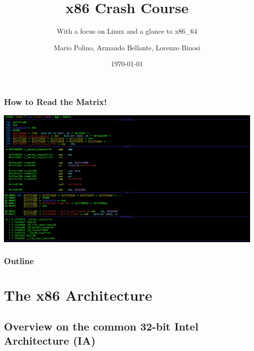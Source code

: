 \documentclass[]{beamer}
\title{x86 Crash Course}
\subtitle{With a focus on Linux and a glance to x86\_64}
\author[NECSTLab]{Mario Polino, Armando Bellante, Lorenzo Binosi}
\institute{DEIB, Politecnico di Milano}
\date{\today}
\begin{document}
\begin{frame}
	\titlepage
\end{frame}



\begin{frame}
	\frametitle{How to Read the Matrix!}
  \hspace*{-11mm}
  \includegraphics[width=\paperwidth]{./images/pwndbg.png}
\end{frame}
\begin{frame}
  \frametitle{Outline}
  \tableofcontents
\end{frame}

\section{The x86 Architecture}
\subsection{Overview on the common 32-bit Intel Architecture (IA)}
\end{document}

